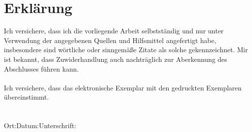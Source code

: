 \chapter*{Erklärung}

Ich versichere, dass ich die vorliegende Arbeit selbstständig und nur unter Verwendung der angegebenen Quellen und Hilfsmittel angefertigt habe, insbesondere sind wörtliche oder sinngemäße Zitate als solche gekennzeichnet. Mir ist bekannt, dass Zuwiderhandlung auch nachträglich zur Aberkennung des Abschlusses führen kann.\\\\
Ich versichere, dass das elektronische Exemplar mit den gedruckten Exemplaren übereinstimmt.
\\\\\\
Ort:\hspace{3cm}Datum:\hspace{3cm}Unterschrift: